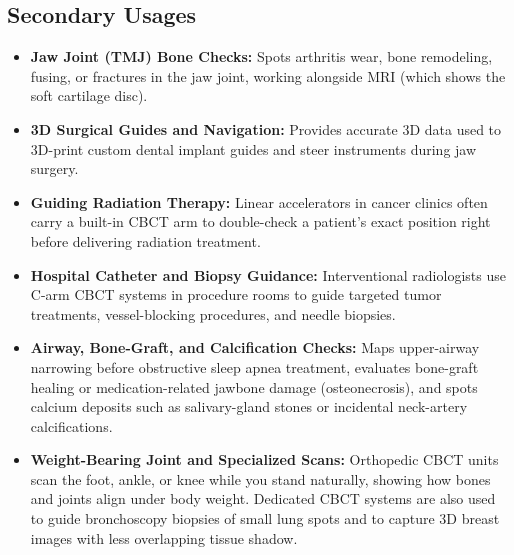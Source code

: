 \subsection{Secondary Usages}
\begin{itemize}
    \item \textbf{Jaw Joint (TMJ) Bone Checks:} Spots arthritis wear, bone remodeling, fusing, or fractures in the jaw joint, working alongside MRI (which shows the soft cartilage disc).
    \item \textbf{3D Surgical Guides and Navigation:} Provides accurate 3D data used to 3D-print custom dental implant guides and steer instruments during jaw surgery.
    \item \textbf{Guiding Radiation Therapy:} Linear accelerators in cancer clinics often carry a built-in CBCT arm to double-check a patient's exact position right before delivering radiation treatment.
    \item \textbf{Hospital Catheter and Biopsy Guidance:} Interventional radiologists use C-arm CBCT systems in procedure rooms to guide targeted tumor treatments, vessel-blocking procedures, and needle biopsies.
    \item \textbf{Airway, Bone-Graft, and Calcification Checks:} Maps upper-airway narrowing before obstructive sleep apnea treatment, evaluates bone-graft healing or medication-related jawbone damage (osteonecrosis), and spots calcium deposits such as salivary-gland stones or incidental neck-artery calcifications.
    \item \textbf{Weight-Bearing Joint and Specialized Scans:} Orthopedic CBCT units scan the foot, ankle, or knee while you stand naturally, showing how bones and joints align under body weight. Dedicated CBCT systems are also used to guide bronchoscopy biopsies of small lung spots and to capture 3D breast images with less overlapping tissue shadow.
\end{itemize}

